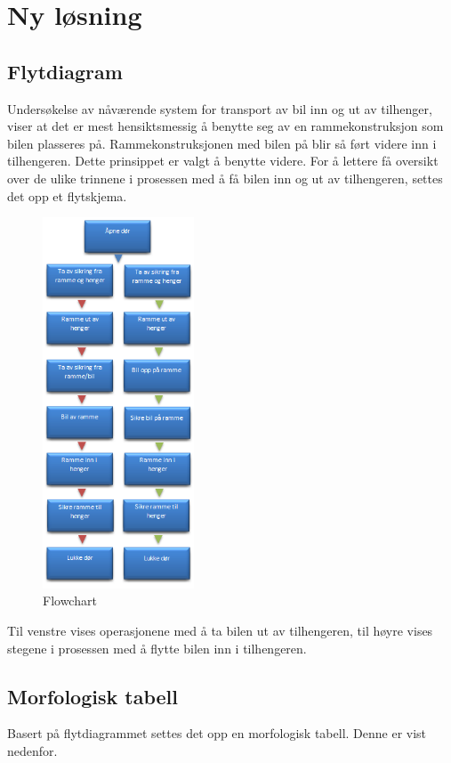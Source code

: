 \section{Ny løsning}
\subsection{Flytdiagram}
\begin{flushleft}
Undersøkelse av nåværende system for transport av bil inn og ut av tilhenger, viser at det er mest hensiktsmessig å benytte seg av en rammekonstruksjon som bilen plasseres på. Rammekonstruksjonen med bilen på blir så ført videre inn i tilhengeren. Dette prinsippet er valgt å benytte videre. For å lettere få oversikt over de ulike trinnene i prosessen med å få bilen inn og ut av tilhengeren, settes det opp et flytskjema.
\end{flushleft}

\begin{figure}[h!tb]
\begin{center}
\leavevmode
\includegraphics[width=0.4\textwidth]{images/Bilde_3}
\end{center}
\caption{Flowchart}
\label{fig:flowchart}
\end{figure}

\begin{flushleft}
Til venstre vises operasjonene med å ta bilen ut av tilhengeren, til høyre vises stegene i prosessen med å flytte bilen inn i tilhengeren.\newpage

\subsection{Morfologisk tabell}
Basert på flytdiagrammet settes det opp en morfologisk tabell. Denne er vist nedenfor.
\end{flushleft}

